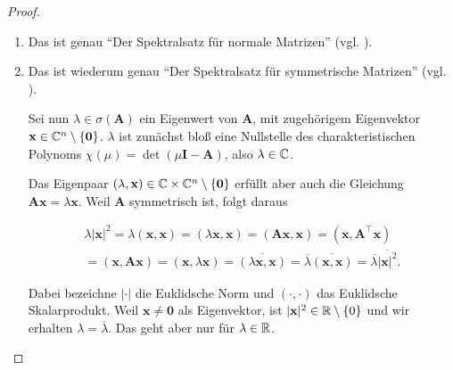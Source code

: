             \begin{proof}

                \begin{enumerate}[
                    label = \texttt{ad} \arabic*.,
                    wide,
                    labelindent = 0pt
                ]

                    \item Das ist genau \enquote{Der Spektralsatz für normale Matrizen} (vgl. \cite[Kapitel 17.7]{brokate2015grundwissen}).

                    \item Das ist wiederum genau \enquote{Der Spektralsatz für symmetrische Matrizen} (vgl. \cite[Kapitel 17.7]{brokate2015grundwissen}).

                    Sei nun $\lambda \in \sigma(\mathbf A)$ ein Eigenwert von $\mathbf A$, mit zugehörigem Eigenvektor $\mathbf x \in \mathbb C^n \setminus {\left \{ \mathbf 0 \right \}}$.
                    $\lambda$ ist zunächst bloß eine Nullstelle des charakteristischen Polynoms $\chi(\mu) = \det(\mu \mathbf I - \mathbf A)$, also $\lambda \in \mathbb C$.

                    Das Eigenpaar $(\lambda, \mathbf x) \in \mathbb C \times \mathbb C^n \setminus {\left \{ \mathbf 0 \right \}}$ erfüllt aber auch die Gleichung $\mathbf A \mathbf x = \lambda \mathbf x$.
                    Weil $\mathbf A$ symmetrisch ist, folgt daraus

                    \begin{multline*}
                        \lambda |\mathbf x|^2
                        =
                        \lambda (\mathbf x, \mathbf x)
                        =
                        (\lambda \mathbf x, \mathbf x)
                        =
                        (\mathbf A \mathbf x, \mathbf x)
                        =
                        (\mathbf x, \mathbf A^\top \mathbf x) \\
                        =
                        (\mathbf x, \mathbf A \mathbf x)
                        =
                        (\mathbf x, \lambda \mathbf x)
                        =
                        \overline{(\lambda \mathbf x, \mathbf x)}
                        =
                        \overline \lambda \overline{(\mathbf x, \mathbf x)}
                        =
                        \overline \lambda \overline{|\mathbf x|^2}.
                    \end{multline*}

                    Dabei bezeichne $|\cdot|$ die Euklidsche Norm und $(\cdot, \cdot)$ das Euklidsche Skalarprodukt.
                    Weil $\mathbf x \neq \mathbf 0$ als Eigenvektor, ist $|\mathbf x|^2 \in \mathbb R \setminus {\left \{ 0 \right \}}$ und wir erhalten $\lambda = \overline \lambda$.
                    Das geht aber nur für $\lambda \in \mathbb R$.

                \end{enumerate}
            \end{proof}

